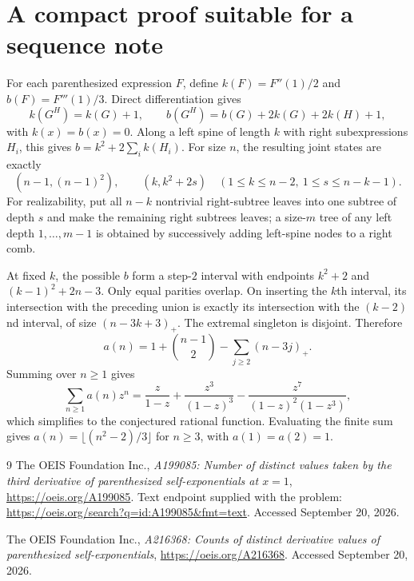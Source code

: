 \documentclass[11pt,letterpaper]{article}
\numberwithin{equation}{section}
\theoremstyle{definition}
\theoremstyle{remark}
\begin{document}
\clearpage
\section{A compact proof suitable for a sequence note}
\label{app:compact}
For each parenthesized expression $F$, define
$k(F)=F''(1)/2$ and $b(F)=F'''(1)/3$.
Direct differentiation gives
\[
 k(G^H)=k(G)+1,\qquad
 b(G^H)=b(G)+2k(G)+2k(H)+1,
\]
with $k(x)=b(x)=0$.
Along a left spine of length $k$ with right subexpressions $H_i$,
this gives $b=k^2+2\sum_i k(H_i)$.
For size $n$, the resulting joint states are exactly
\[
 (n-1,(n-1)^2),\qquad
 (k,k^2+2s)\quad(1\le k\le n-2,\ 1\le s\le n-k-1).
\]
For realizability, put all $n-k$ nontrivial right-subtree leaves into
one subtree of depth $s$ and make the remaining right subtrees leaves;
a size-$m$ tree of any left depth $1,\ldots,m-1$ is obtained by
successively adding left-spine nodes to a right comb.

At fixed $k$, the possible $b$ form a step-$2$ interval with endpoints
$k^2+2$ and $(k-1)^2+2n-3$. Only equal parities overlap. On inserting
the $k$th interval, its intersection with the preceding union is
exactly its intersection with the $(k-2)$nd interval, of size
$(n-3k+3)_+$. The extremal singleton is disjoint. Therefore
\[
 a(n)=1+\binom{n-1}{2}-\sum_{j\ge2}(n-3j)_+.
\]
Summing over $n\ge1$ gives
\[
 \sum_{n\ge1}a(n)z^n
 =\frac{z}{1-z}+\frac{z^3}{(1-z)^3}
  -\frac{z^7}{(1-z)^2(1-z^3)},
\]
which simplifies to the conjectured rational function.
Evaluating the finite sum gives
$a(n)=\lfloor(n^2-2)/3\rfloor$ for $n\ge3$, with $a(1)=a(2)=1$.

\begin{thebibliography}{9}
The OEIS Foundation Inc.,
\emph{A199085: Number of distinct values taken by the third derivative
of parenthesized self-exponentials at $x=1$},
\url{https://oeis.org/A199085}.
Text endpoint supplied with the problem:
\url{https://oeis.org/search?q=id:A199085&fmt=text}.
Accessed September 20, 2026.

The OEIS Foundation Inc.,
\emph{A216368: Counts of distinct derivative values of parenthesized
self-exponentials},
\url{https://oeis.org/A216368}.
Accessed September 20, 2026.
\end{thebibliography}
\end{document}

